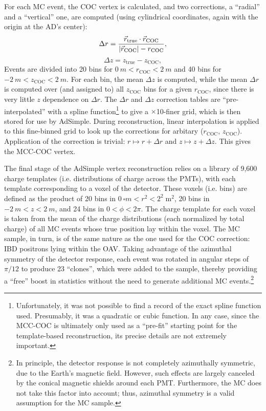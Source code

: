 \documentclass[../thesis.tex]{subfiles}
\begin{document}
For each MC event, the COC vertex is calculated, and two corrections, a ``radial'' and a ``vertical'' one, are computed (using cylindrical coordinates, again with the origin at the AD's center):
\begin{equation}
  \Delta r = \frac{\vec{r}_{\mathrm{true}} \cdot \vec{r}_{\mathrm{COC}}}{\lvert \vec{r}_{\mathrm{COC}}\rvert - r_{\mathrm{COC}}},
\end{equation}
\begin{equation}
  \Delta z = z_{\mathrm{true}} - z_{\mathrm{COC}},
\end{equation}
Events are divided into 20 bins for $\SI{0}{m} < r_{\mathrm{COC}} < \SI{2}{m}$ and 40 bins for $\SI{-2}{m} < z_{\mathrm{COC}} < \SI{2}{m}$. For each bin, the mean $\Delta z$ is computed, while the mean $\Delta r$ is computed over (and assigned to) all $z{_\mathrm{COC}}$ bins for a given $r_{\mathrm{COC}}$, since there is very little $z$ dependence on $\Delta r$. The $\Delta r$ and $\Delta z$ correction tables are ``pre-interpolated'' with a spline function\footnote{Unfortunately, it was not possible to find a record of the exact spline function used. Presumably, it was a quadratic or cubic function. In any case, since the MCC-COC is ultimately only used as a ``pre-fit'' starting point for the template-based reconstruction, its precise details are not extremely important.} to give a $\times$10-finer grid, which is then stored for use by AdSimple. During reconstruction, linear interpolation is applied to this fine-binned grid to look up the corrections for arbitary ($r_{\mathrm{COC}}$, $z_{\mathrm{COC}}$). Application of the correction is trivial: $r \mapsto r + \Delta r$ and $z \mapsto z + \Delta z$. This gives the MCC-COC vertex.

The final stage of the AdSimple vertex reconstruction relies on a library of 9,600 charge templates (i.e. distributions of charge across the PMTs), with each template corresponding to a voxel of the detector. These voxels (i.e. bins) are defined as the product of 20 bins in $\SI{0}{\square m} < r^2 < 2^2\;\mathrm{m}^2$, 20 bins in $\SI{-2}{m} < z < \SI{2}{m}$, and 24 bins in $0 < \phi < 2\pi$. The charge template for each voxel is taken from the mean of the charge distributions (each normalized by total charge) of all MC events whose true position lay within the voxel. The MC sample, in turn, is of the same nature as the one used for the COC correction: IBD positrons lying within the OAV. Taking advantage of the azimuthal symmetry of the detector response, each event was rotated in angular steps of $\pi/12$ to produce 23 ``clones'', which were added to the sample, thereby providing a ``free'' boost in statistics without the need to generate additional MC events.\footnote{In principle, the detector response is not completely azimuthally symmetric, due to the Earth's magnetic field. However, such effects are largely canceled by the conical magnetic shields around each PMT. Furthermore, the MC does not take this factor into account; thus, azimuthal symmetry is a valid assumption for the MC sample.}
\end{document}
